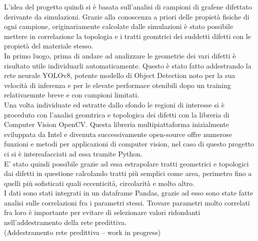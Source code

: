 \documentclass[12pt,a4paper,openright,twoside]{report}
\begin{document}
L'idea del progetto quindi si è basata sull'analisi di campioni di grafene difettato derivante da simulazioni. Grazie alla conoscenza a priori delle propietà fisiche di ogni campione, originariamente calcolate dalle simulazioni è stato possibile mettere in correlazione la topologia e i tratti geomtrici dei suddetti difetti con le propietà del materiale stesso.\\
In primo luogo, prima di andare ad analizzare le geometrie dei vari difetti è risultato utile individuarli automaticamente. 
Questo è stato fatto addestrando la rete neurale YOLOv8, potente modello di Object Detection noto per la sua velocità di inferenza e per le elevate performace otenibili dopo un training relativaemnte breve e con campioni limitati.\\
Una volta individuate ed estratte dallo sfondo le regioni di interesse si è proceduto con l'analisi geomtrica e topologica dei difetti con la libreria di Computer Vision OpenCV.
Questa libreria multipiattaforma inizialmente sviluppata da Intel e divenuta successivamente open-source offre numerose funzioni e metodi per applicazioni di computer vision, nel caso di questo progetto ci si è intereafacciati ad essa tramite Python. \\
E' stato quindi possibile grazie ad essa estrapolare tratti geometrici e topologici dai difetti in questione calcolando tratti più semplici come area, perimetro fino a quelli più sofisticati quali eccenticità, circolarità e molto altro.\\
I dati sono stati integrati in un dataframe Pandas, grazie ad esso sono state fatte analisi sulle correlazioni fra i parametri stessi. Trovare parametri molto correlati fra loro è importante per evitare di selezionare valori ridondanti nell'addestramento della rete predittiva.\\

(Addestramento rete predittiva -- work in progress)
\clearpage{\pagestyle{empty}\cleardoublepage}
\rhead[\fancyplain{}{\bfseries\leftmark}]{\fancyplain{}{\bfseries\thepage}}
\end{document}
